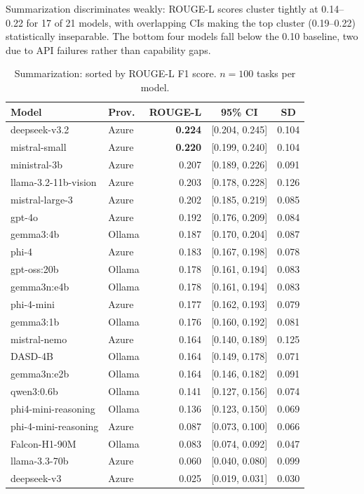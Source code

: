 \documentclass[11pt,a4paper]{article}
\begin{document}
Summarization discriminates weakly: ROUGE-L scores cluster tightly at 0.14--0.22 for 17 of 21 models, with overlapping CIs making the top cluster (0.19--0.22) statistically inseparable. The bottom four models fall below the 0.10 baseline, two due to API failures rather than capability gaps.

\begin{table}[h]
\centering
\caption{Summarization: sorted by ROUGE-L F1 score. $n = 100$ tasks per model.}
\vspace{4pt}
\small
\begin{tabular}{@{}llrcc@{}}
\toprule
\textbf{Model} & \textbf{Prov.} & \textbf{ROUGE-L} & \textbf{95\% CI} & \textbf{SD} \\
\midrule
deepseek-v3.2        & Azure  & \textbf{0.224} & [0.204, 0.245] & 0.104 \\
mistral-small        & Azure  & \textbf{0.220} & [0.199, 0.240] & 0.104 \\
ministral-3b         & Azure  & 0.207          & [0.189, 0.226] & 0.091 \\
llama-3.2-11b-vision & Azure  & 0.203          & [0.178, 0.228] & 0.126 \\
mistral-large-3      & Azure  & 0.202          & [0.185, 0.219] & 0.085 \\
gpt-4o               & Azure  & 0.192          & [0.176, 0.209] & 0.084 \\
gemma3:4b            & Ollama & 0.187          & [0.170, 0.204] & 0.087 \\
phi-4                & Azure  & 0.183          & [0.167, 0.198] & 0.078 \\
gpt-oss:20b          & Ollama & 0.178          & [0.161, 0.194] & 0.083 \\
gemma3n:e4b          & Ollama & 0.178          & [0.161, 0.194] & 0.083 \\
phi-4-mini           & Azure  & 0.177          & [0.162, 0.193] & 0.079 \\
gemma3:1b            & Ollama & 0.176          & [0.160, 0.192] & 0.081 \\
mistral-nemo         & Azure  & 0.164          & [0.140, 0.189] & 0.125 \\
DASD-4B              & Ollama & 0.164          & [0.149, 0.178] & 0.071 \\
gemma3n:e2b          & Ollama & 0.164          & [0.146, 0.182] & 0.091 \\
qwen3:0.6b           & Ollama & 0.141          & [0.127, 0.156] & 0.074 \\
phi4-mini-reasoning  & Ollama & 0.136          & [0.123, 0.150] & 0.069 \\
phi-4-mini-reasoning & Azure  & 0.087          & [0.073, 0.100] & 0.066 \\
Falcon-H1-90M        & Ollama & 0.083          & [0.074, 0.092] & 0.047 \\
llama-3.3-70b        & Azure  & 0.060          & [0.040, 0.080] & 0.099 \\
deepseek-v3          & Azure  & 0.025          & [0.019, 0.031] & 0.030 \\
\bottomrule
\end{tabular}
\label{tab:summarization}
\end{table}
\end{document}
